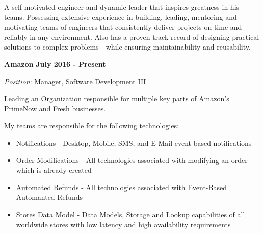 \documentclass{article}
\begin{document}
\par
\vspace{2\baselineskip}
\par
A self-motivated engineer and dynamic leader that inspires greatness in his teams.  Possessing extensive
experience in building, leading, mentoring and motivating teams of engineers that consistently deliver projects on time and
reliably in any environment.  Also has a proven track record of designing practical solutions to complex problems - while
ensuring maintainability and reusability.
\par
\vspace{\baselineskip}
\vspace{\baselineskip}
{\bf Amazon}
\hfill {\bf July 2016 - Present}
\vspace{.03in}
\par
{\it Position}: Manager, Software Development III
\vspace{\baselineskip}
\par
Leading an Organization responsible for multiple key parts of Amazon's PrimeNow and Fresh businesses.  
\par
\vspace{\baselineskip}
My teams are responsible for the following technologies:
\begin{small}
\begin{itemize}
  \item Notifications - Desktop, Mobile, SMS, and E-Mail event based notifications
  \item Order Modifications - All technologies associated with modifying an order which is already created
  \item Automated Refunds - All technologies associated with Event-Based Automanted Refunds
  \item Stores Data Model - Data Models, Storage and Lookup capabilities of all worldwide stores with low latency and high availability requirements
\end{itemize}
\end{small}
\end{document}
